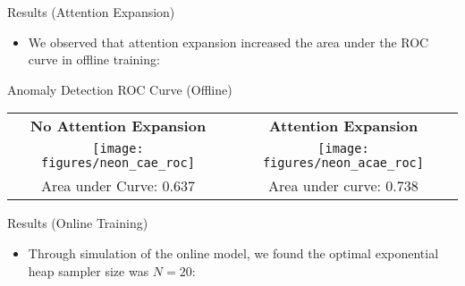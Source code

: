 \documentclass[10pt,handout]{beamer}
\begin{document}
\begin{frame}{Results (Attention Expansion)}
\begin{itemize}
\item We observed that attention expansion increased the area under the ROC curve in offline training:\\[0.5cm]
\end{itemize}

\begin{exampleblock}{Anomaly Detection ROC Curve (Offline)}
~\\[2mm]
\begin{tabular}{c | c}
\textbf{No Attention Expansion} & \textbf{Attention Expansion}\\
\texttt{[image: figures/neon\_cae\_roc]} & \texttt{[image: figures/neon\_acae\_roc]} \\
Area under Curve:  0.637 & Area under curve: 0.738 \\ 
\end{tabular}
\end{exampleblock}
\end{frame}

\begin{frame}{Results (Online Training)}

\begin{itemize}
\item Through simulation of the online model, we found the optimal exponential heap sampler size was $N = 20$:\\[0.5cm]
\end{itemize}

\end{frame}
\end{document}
